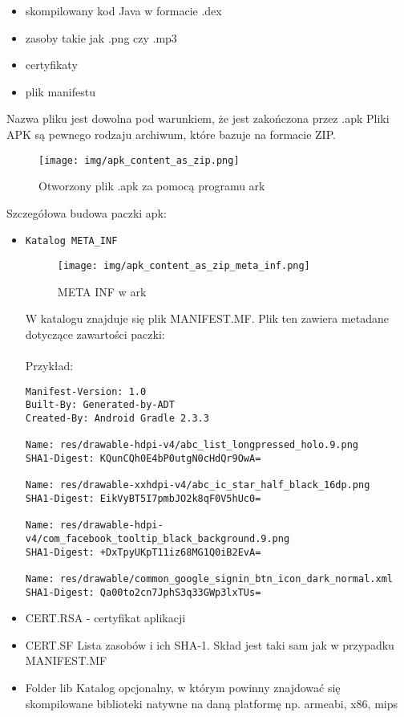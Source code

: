 \documentclass[12pt,a4paper,leqno,oneside,titlepage]{book}
\begin{document}
\begin{itemize}
\item skompilowany kod Java w formacie .dex
\item zasoby takie jak .png czy .mp3
\item certyfikaty
\item plik manifestu
\end{itemize}
Nazwa pliku jest dowolna pod warunkiem, że jest zakończona przez .apk
Pliki APK są pewnego rodzaju archiwum, które bazuje na formacie ZIP.
\begin{figure}[H]
	\centering
	\texttt{[image: img/apk\_content\_as\_zip.png]}
	\caption{Otworzony plik .apk za pomocą programu ark}
\end{figure}
Szczegółowa budowa paczki apk:
\begin{itemize}
\item \texttt{Katalog META\_INF}
\begin{figure}[H]
	\centering
	\texttt{[image: img/apk\_content\_as\_zip\_meta\_inf.png]}
	\caption{META INF w ark}
\end{figure}
W katalogu znajduje się plik MANIFEST.MF. Plik ten zawiera metadane dotyczące zawartości paczki:\\\\
Przykład:
\begin{lstlisting}
Manifest-Version: 1.0
Built-By: Generated-by-ADT
Created-By: Android Gradle 2.3.3

Name: res/drawable-hdpi-v4/abc_list_longpressed_holo.9.png
SHA1-Digest: KQunCQh0E4bP0utgN0cHdQr9OwA=

Name: res/drawable-xxhdpi-v4/abc_ic_star_half_black_16dp.png
SHA1-Digest: EikVyBT5I7pmbJO2k8qF0V5hUc0=

Name: res/drawable-hdpi-v4/com_facebook_tooltip_black_background.9.png
SHA1-Digest: +DxTpyUKpT11iz68MG1Q0iB2EvA=

Name: res/drawable/common_google_signin_btn_icon_dark_normal.xml
SHA1-Digest: Qa00to2cn7JphS3q33GWp3lxTUs=
\end{lstlisting}

\item CERT.RSA - certyfikat aplikacji
\item CERT.SF
Lista zasobów i ich SHA-1. Skład jest taki sam jak w przypadku MANIFEST.MF


\item Folder lib
Katalog opcjonalny, w którym powinny znajdować się skompilowane biblioteki natywne na daną platformę np. armeabi, x86, mips


\end{itemize}
\end{document}

